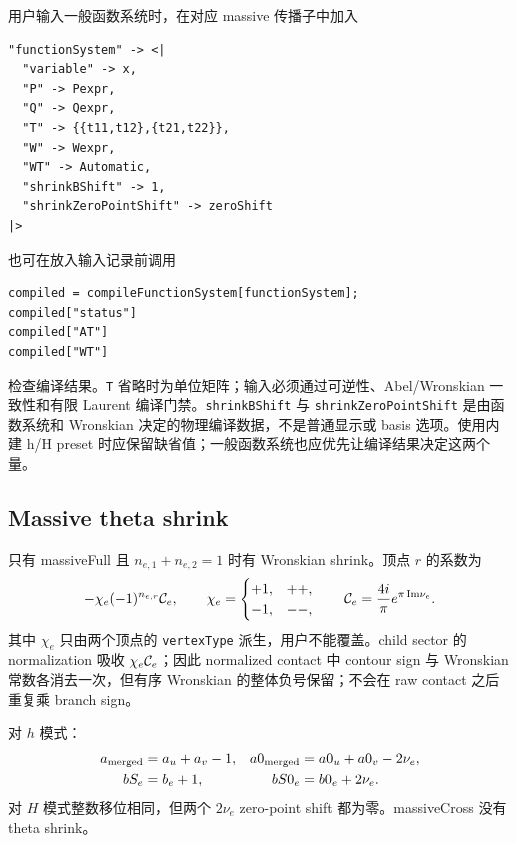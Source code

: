 ﻿\documentclass[a4paper,11pt]{article}
\begin{document}
用户输入一般函数系统时，在对应 massive 传播子中加入
\begin{verbatim}
"functionSystem" -> <|
  "variable" -> x,
  "P" -> Pexpr,
  "Q" -> Qexpr,
  "T" -> {{t11,t12},{t21,t22}},
  "W" -> Wexpr,
  "WT" -> Automatic,
  "shrinkBShift" -> 1,
  "shrinkZeroPointShift" -> zeroShift
|>
\end{verbatim}
也可在放入输入记录前调用
\begin{verbatim}
compiled = compileFunctionSystem[functionSystem];
compiled["status"]
compiled["AT"]
compiled["WT"]
\end{verbatim}
检查编译结果。\texttt{T} 省略时为单位矩阵；输入必须通过可逆性、Abel/Wronskian 一致性和有限 Laurent 编译门禁。\texttt{shrinkBShift} 与 \texttt{shrinkZeroPointShift} 是由函数系统和 Wronskian 决定的物理编译数据，不是普通显示或 basis 选项。使用内建 h/H preset 时应保留缺省值；一般函数系统也应优先让编译结果决定这两个量。

\subsection{Massive theta shrink}

只有 massiveFull 且 $n_{e,1}+n_{e,2}=1$ 时有 Wronskian shrink。顶点 $r$ 的系数为
\begin{equation}
  -\chi_e(-1)^{n_{e,r}}{\cal C}_e,
  \qquad
  \chi_e=
  \begin{cases}
  +1,&++,\\
  -1,&--,
  \end{cases}
 \qquad
 {\cal C}_e=\frac{4i}{\pi}e^{\pi\,\mathrm{Im}\nu_e}.
 \label{massiveShrinkSign}
\end{equation}
其中 $\chi_e$ 只由两个顶点的 \texttt{vertexType} 派生，用户不能覆盖。child sector 的
normalization 吸收 $\chi_e{\cal C}_e$；因此 normalized contact 中 contour sign 与
Wronskian 常数各消去一次，但有序 Wronskian 的整体负号保留；不会在 raw contact 之后重复乘 branch sign。

对 $h$ 模式：
\begin{align}
 a_{\rm merged}&=a_u+a_v-1,&
 a0_{\rm merged}&=a0_u+a0_v-2\nu_e,\\
 bS_e&=b_e+1,&
 bS0_e&=b0_e+2\nu_e.
\end{align}
对 $H$ 模式整数移位相同，但两个 $2\nu_e$ zero-point shift 都为零。massiveCross 没有 theta shrink。
\end{document}
